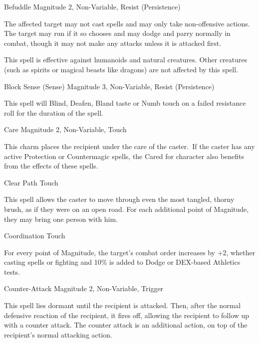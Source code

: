 \begin{rpg-spell}
{Befuddle}
{Magnitude 2, Non-Variable, Resist (Persistence)}

The affected target may not cast spells and may only take non-offensive actions. The target may run if it so chooses and may dodge and parry normally in combat, though it may not make any attacks unless it is attacked first. 

This spell is effective against humanoids and natural creatures. Other creatures (such as spirits or magical beasts like dragons) are not affected by this spell. 
\end{rpg-spell}

 
\begin{rpg-spell}
{Block Sense (Sense)}
{Magnitude 3, Non-Variable, Resist (Persistence)}

This spell will Blind, Deafen, Bland taste or Numb touch on a failed resistance roll for the duration of the spell.
\end{rpg-spell}


\begin{rpg-spell}
{Care}
{Magnitude 2, Non-Variable, Touch}

This charm places the recipient under the care of the caster. If the caster has any active Protection or Countermagic spells, the Cared for character also benefits from the effects of these spells.
\end{rpg-spell}

\begin{rpg-spell}
{Clear Path}
{Touch}

This spell allows the caster to move through even the most tangled, thorny brush, as if they were on an open road. For each additional point of Magnitude, they may bring one person with him. 
\end{rpg-spell}


\begin{rpg-spell}
{Coordination}
{Touch}

For every point of Magnitude, the target’s combat order increases by +2, whether casting spells or fighting and 10\% is added to Dodge or DEX-based Athletics tests. 
\end{rpg-spell}


\begin{rpg-spell}
{Counter-Attack}
{Magnitude 2, Non-Variable, Trigger}

This spell lies dormant until the recipient is attacked. Then, after the normal defensive reaction of the recipient, it fires off, allowing the recipient to follow up with a counter attack. The counter attack is an additional action, on top of the recipient’s normal attacking action.
\end{rpg-spell}


